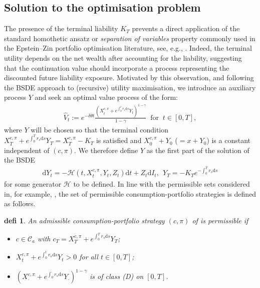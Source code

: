 \documentclass[12,reqno]{amsart}
\numberwithin{equation}{section}
\newtheorem{defi}{defi}[section]
\begin{document}
\subsection{Solution to the optimisation problem}\label{Solution to the optimisation problem}
The presence of the terminal liability $K_T$ prevents a direct application of the standard homothetic ansatz or \textit{separation of variables} property commonly used in the Epstein--Zin portfolio optimisation literature, see, e.g., \cite{aurand2023epstein,feng2026consumption,kraft2017optimal,xing2017consumption}. Indeed, the terminal utility depends on the net wealth after accounting for the liability, suggesting that the continuation value should incorporate a process representing the discounted future liability exposure. Motivated by this observation, and following the BSDE approach to (recursive) utility maximisation, we introduce an auxiliary process $Y$ and seek an optimal value process of the form:
\begin{align}\label{Ansatz_Optimal process}
	\widehat{V}_{t}:=e^{-\delta\theta t}\frac{(X_{t}^{c,\pi}+e^{\int_{0}^{t}r_{s}\mathrm{d}s}Y_{t}) ^{1-\gamma}}{1-\gamma}~\text{ for }~t\in[0,T],
\end{align}
where $Y$ will be chosen so that the terminal condition $X_{T}^{c,\pi}+e^{\int_{0}^{T}r_{s}\mathrm{d}s}Y_{T}=X_{T}^{c,\pi}-K_{T}$
is satisfied and $X_{0}^{c,\pi}+Y_{0}$ ($=x+Y_{0}$) is a constant independent of $(c,\pi)$. We therefore define $Y$ as the first part of the solution of the BSDE
\begin{align}\label{Auxiliary BSDE}
	\mathrm{d}Y_{t}=-\mathcal{H}(t,X_{t}^{c,\pi},Y_{t},Z_{t})\mathrm{d}t+Z_{t}\mathrm{d}I_{t},~~Y_{T}=-K_{T}e^{-\int_{0}^{T}r_{s}\mathrm{d}s}
\end{align}
for some generator $\mathcal{H}$ to be defined. In line with the permissible sets considered in, for example, \cite{aurand2023epstein,feng2026consumption,xing2017consumption}, the set of permissible consumption-portfolio strategies is defined as follows.
\begin{defi}\label{Permissible strategies}
	An admissible consumption-portfolio strategy $(c,\pi)$ of is \textit{permissible} if
	\begin{itemize}
		\item[$(i)$] $c\in\mathcal{C}_{a}$ with $c_{T}=X_{T}^{c,\pi}+e^{\int_{0}^{T}r_{s}\mathrm{d}s}Y_{T}$;
		\item[$(ii)$] $X_{t}^{c,\pi}+e^{\int_{0}^{t}r_{s}\mathrm{d}s}Y_{t}>0$ for all $t\in[0,T]$;
		\item[$(iii)$] $(X_{\cdot}^{c,\pi}+e^{\int_{0}^{\cdot}r_{s}\mathrm{d}s}Y_{\cdot})^{1-\gamma}$ is of class (D) on $[0,T]$.
	\end{itemize}
\end{defi}
\end{document}
